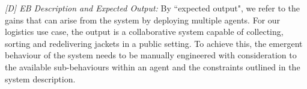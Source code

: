 \documentclass[runningheads]{llncs}
\begin{document}
\emph{[D] EB Description and Expected Output:}
By ``expected output", we refer to the gains that can arise from the system by deploying multiple agents. For our logistics use case, the output is a collaborative system capable of collecting, sorting and redelivering jackets in a public setting. 
To achieve this, the emergent behaviour of the system needs to be manually engineered with consideration to the available sub-behaviours within an agent and the constraints outlined in the system description.

%


\end{document}
